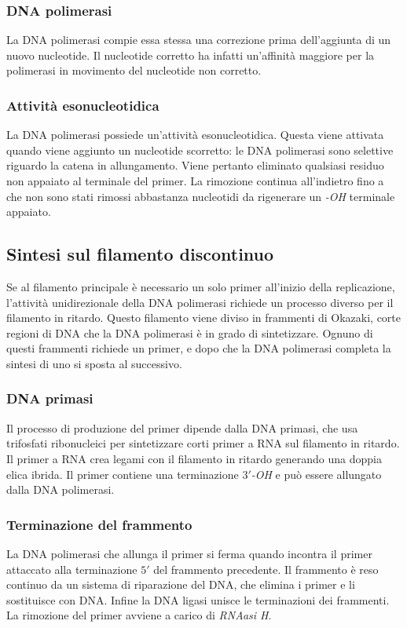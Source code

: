 		\subsubsection{DNA polimerasi}
		La DNA polimerasi compie essa stessa una correzione prima dell'aggiunta di un nuovo nucleotide.
		Il nucleotide corretto ha infatti un'affinit\`a maggiore per la polimerasi in movimento del nucleotide non corretto.

		\subsubsection{Attivit\`a esonucleotidica}
		La DNA polimerasi possiede un'attivit\`a esonucleotidica.
		Questa viene attivata quando viene aggiunto un nucleotide scorretto: le DNA polimerasi sono selettive riguardo la catena in allungamento.
		Viene pertanto eliminato qualsiasi residuo non appaiato al terminale del primer.
		La rimozione continua all'indietro fino a che non sono stati rimossi abbastanza nucleotidi da rigenerare un \emph{-OH} terminale appaiato.

	\subsection{Sintesi sul filamento discontinuo}
	Se al filamento principale \`e necessario un solo primer all'inizio della replicazione, l'attivit\`a unidirezionale della DNA polimerasi richiede un processo diverso per il filamento in ritardo.
	Questo filamento viene diviso in frammenti di Okazaki, corte regioni di DNA che la DNA polimerasi \`e in grado di sintetizzare.
	Ognuno di questi frammenti richiede un primer, e dopo che la DNA polimerasi completa la sintesi di uno si sposta al successivo.

		\subsubsection{DNA primasi}
		Il processo di produzione del primer dipende dalla DNA primasi, che usa trifosfati ribonucleici per sintetizzare corti primer a RNA sul filamento in ritardo.
		Il primer a RNA crea legami con il filamento in ritardo generando una doppia elica ibrida.
		Il primer contiene una terminazione \emph{$3'$-OH} e pu\`o essere allungato dalla DNA polimerasi.
		
		\subsubsection{Terminazione del frammento}
		La DNA polimerasi che allunga il primer si ferma quando incontra il primer attaccato alla terminazione $5'$ del frammento precedente.
		Il frammento \`e reso continuo da un sistema di riparazione del DNA, che elimina i primer e li sostituisce con DNA.
		Infine la DNA ligasi unisce le terminazioni dei frammenti.
		La rimozione del primer avviene a carico di \emph{RNAasi H}.

